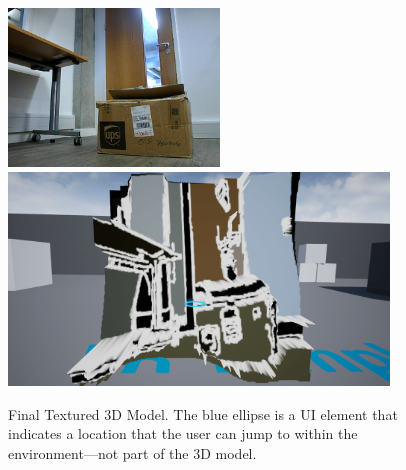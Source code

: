 \begin{figure}[H]
    \begin{center}
      \includegraphics[width=0.5\textwidth]{Figures/outlinePic1.jpg}
      \includegraphics[width=0.9\textwidth]{Figures/OutlinePic2.png}
      \caption[Final Textured 3D Model]{Final Textured 3D Model. The blue ellipse is a UI element that indicates a location that the user can jump to within the environment---not part of the 3D model.}
      \label{fig:3DModel}
    \end{center}
\end{figure}